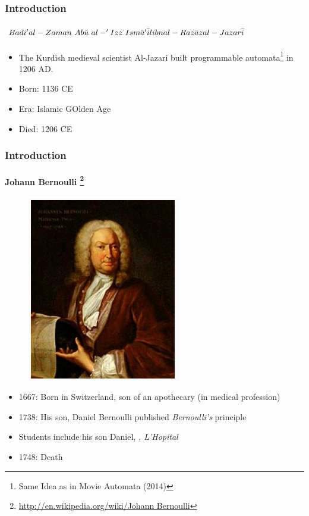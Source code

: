\documentclass[hyperref={pdfpagelabels=true}]{beamer}
\begin{document}
\begin{frame}
\frametitle{Introduction}
\framesubtitle{$Badi'al-Zaman \ Ab\bar{u} \ al-'Izz \ Ism\bar{a}'\bar{i}l \newline ibn al-Raz\bar{a}z al-Jazar\bar{i}$}
\begin{itemize}
\item[\ding{45}] The Kurdish medieval scientist Al-Jazari built programmable automata\footnote{Same Idea as in Movie Automata (2014)} in 1206 AD.
\item Born: 1136 CE
\item Era: Islamic GOlden Age
\item Died: 1206 CE
\end{itemize}
\end{frame}

\begin{frame}
\frametitle{Introduction}
\framesubtitle{Johann Bernoulli \footnote{\url{http://en.wikipedia.org/wiki/Johann Bernoulli}}}
\begin{figure}[!tbp]
\centering
\includegraphics[scale = 0.35]{figs/Selection_0122.png}
\end{figure}
\begin{itemize}
\item 1667: Born in Switzerland, son of an apothecary
(in medical profession)
\item 1738: His son, Daniel Bernoulli published
\textit{Bernoulli's} principle
\item Students include his son Daniel, \em{}, L'Hopital
\item 1748: Death
\end{itemize}
\end{frame}
\end{document}

